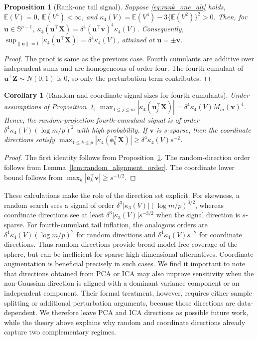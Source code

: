 \documentclass[11pt]{article}
\theoremstyle{plain}
\newtheorem{proposition}{Proposition}
\newtheorem{corollary}{Corollary}
\theoremstyle{definition}
\theoremstyle{remark}
\def\E{\mathbb{E}}
\def\X{\bm{X}}
\def\u{\bm{u}}
\def\v{\bm{v}}
\begin{document}
\begin{proposition}[Rank-one tail signal]
	\label{prop:rank_one_fourth_cumulant}
	Suppose \eqref{eq:rank_one_alt} holds, \(\E(V)=0\), \(\E(V^4)<\infty\), and \(\kappa_4(V)=\E(V^4)-3\{\E(V^2)\}^2>0\). Then, for \(\u\in \mathbb{S}^{p-1}\), $\kappa_4(\u^\top \X)=\delta^4(\u^\top \v)^4\kappa_4(V)$.	Consequently, \(\sup_{\|\u\|=1}|\kappa_4(\u^\top \X)|=\delta^4\kappa_4(V)\), attained at \(\u=\pm \v\).
\end{proposition}

\begin{proof}
	The proof is same as the previous case. Fourth cumulants are additive over independent sums and are homogeneous of order four. The fourth cumulant of \(\u^\top \bm Z \sim N(0,1)\) is 0, so only the perturbation term contributes.
\end{proof}

\begin{corollary}[Random and coordinate signal sizes for fourth cumulants]
	\label{cor:rank_one_tail_signal_sizes}
	Under assumptions of Proposition~\ref{prop:rank_one_fourth_cumulant}, $\max_{1\leqslant j\leqslant m}|\kappa_4(\u_j^\top \X)| = \delta^4\kappa_4(V)M_m(\v)^4$. Hence, the random-projection fourth-cumulant signal is of order \(\delta^4\kappa_4(V)(\log m/p)^2\) with high probability. If \(\v\) is \(s\)-sparse, then the coordinate directions satisfy	$\max_{1\leqslant k\leqslant p}|\kappa_4(\bm e_k^\top \X)| \geqslant \delta^4\kappa_4(V)s^{-2}$.
\end{corollary}

\begin{proof}
	The first identity follows from Proposition~\ref{prop:rank_one_fourth_cumulant}. The random-direction order follows from Lemma~\ref{lem:random_alignment_order}. The coordinate lower bound follows from \(\max_k|\bm e_k^\top \v|\geqslant s^{-1/2}\).
\end{proof}

These calculations make the role of the direction set explicit. For skewness, a random search sees a signal of order \(\delta^3|\kappa_3(V)|(\log m/p)^{3/2}\), whereas coordinate directions see at least \(\delta^3|\kappa_3(V)|s^{-3/2}\) when the signal direction is \(s\)-sparse. For fourth-cumulant tail inflation, the analogous orders are \(\delta^4\kappa_4(V)(\log m/p)^2\) for random directions and \(\delta^4\kappa_4(V)s^{-2}\) for coordinate directions. Thus random directions provide broad model-free coverage of the sphere, but can be inefficient for sparse high-dimensional alternatives. Coordinate augmentation is beneficial precisely in such cases. We find it important to note that directions obtained from PCA or ICA may also improve sensitivity when the non-Gaussian direction is aligned with a dominant variance component or an independent component. Their formal treatment, however, requires either sample splitting or additional perturbation arguments, because those directions are data-dependent. We therefore leave PCA and ICA directions as possible future work, while the theory above explains why random and coordinate directions already capture two complementary regimes. 
\end{document}
